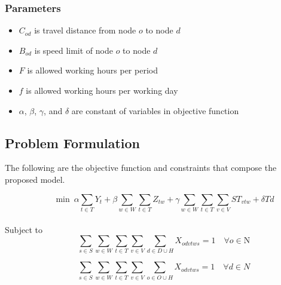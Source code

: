 \documentclass[numbered]{trbunofficial}
\begin{document}
\subsubsection{Parameters}
\begin{itemize}
\item $C_{od}$ is travel distance from node $o$ to node $d$
\item $B_{od}$ is speed limit of node $o$ to node $d$
\item $F$ is allowed working hours per period
\item $f$ is allowed working hours per working day
\item $\alpha$, $\beta$, $\gamma$, and $\delta$ are constant of variables in objective function  
\end{itemize}



\subsection{Problem Formulation}
The following are the objective function and constraints that compose the proposed model.

\begin{equation}\label{eq:1}
    \qquad  \min ~\alpha\sum_{t\in T}Y_{t}+\beta \sum_{w\in W}\sum_{t\in T} Z_{t w}+\gamma \sum_{w\in W}\sum_{t\in T}\sum_{v\in V} S T_{v t w}+\delta T d
\end{equation}
\\
Subject to\\
\begin{equation}
    \qquad 
    \displaystyle \sum_{s\in S} \sum_{w\in W} \sum_{t\in T} \sum_{v\in V} \sum_{d\in D\cup H} X_{o d v t w s}=1 \quad \forall o \in \mathrm{N}\label{eq:2}
\end{equation}

\begin{equation}
    \qquad 
    \sum_{s\in S} \sum_{w\in W} \sum_{t\in T} \sum_{v\in V} \sum_{o\in O\cup H} X_{o d v t w s}=1 \quad \forall d \in N \label{eq:3}
\end{equation}
\end{document}
